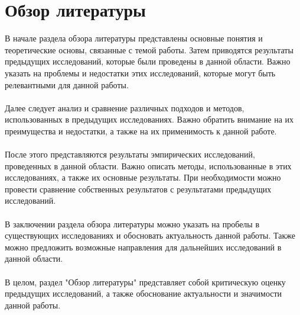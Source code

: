 \documentclass{article}
\begin{document}
\newpage
\section{Обзор литературы}
В начале раздела обзора литературы представлены основные понятия и теоретические основы, связанные с темой работы. Затем приводятся результаты предыдущих исследований, которые были проведены в данной области. Важно указать на проблемы и недостатки этих исследований, которые могут быть релевантными для данной работы.\\
~\\
Далее следует анализ и сравнение различных подходов и методов, использованных в предыдущих исследованиях. Важно обратить внимание на их преимущества и недостатки, а также на их применимость к данной работе.\\
~\\
После этого представляются результаты эмпирических исследований, проведенных в данной области. Важно описать методы, использованные в этих исследованиях, а также их основные результаты. При необходимости можно провести сравнение собственных результатов с результатами предыдущих исследований.\\
~\\
В заключении раздела обзора литературы можно указать на пробелы в существующих исследованиях и обосновать актуальность данной работы. Также можно предложить возможные направления для дальнейших исследований в данной области.\\
~\\
В целом, раздел "{}Обзор литературы"{} представляет собой критическую оценку предыдущих исследований, а также обоснование актуальности и значимости данной работы.
\end{document}
